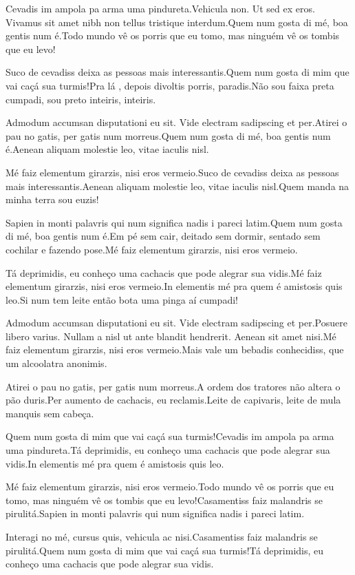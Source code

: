 \documentclass[english]{cenarticle}
\begin{document}
  Cevadis im ampola pa arma uma pindureta.Vehicula non. Ut sed ex eros. Vivamus sit amet nibh non tellus tristique interdum.Quem num gosta di mé, boa gentis num é.Todo mundo vê os porris que eu tomo, mas ninguém vê os tombis que eu levo!
  
  Suco de cevadiss deixa as pessoas mais interessantis.Quem num gosta di mim que vai caçá sua turmis!Pra lá , depois divoltis porris, paradis.Não sou faixa preta cumpadi, sou preto inteiris, inteiris.
  
  Admodum accumsan disputationi eu sit. Vide electram sadipscing et per.Atirei o pau no gatis, per gatis num morreus.Quem num gosta di mé, boa gentis num é.Aenean aliquam molestie leo, vitae iaculis nisl.
  
  Mé faiz elementum girarzis, nisi eros vermeio.Suco de cevadiss deixa as pessoas mais interessantis.Aenean aliquam molestie leo, vitae iaculis nisl.Quem manda na minha terra sou euzis!
  
  Sapien in monti palavris qui num significa nadis i pareci latim.Quem num gosta di mé, boa gentis num é.Em pé sem cair, deitado sem dormir, sentado sem cochilar e fazendo pose.Mé faiz elementum girarzis, nisi eros vermeio.
  
  Tá deprimidis, eu conheço uma cachacis que pode alegrar sua vidis.Mé faiz elementum girarzis, nisi eros vermeio.In elementis mé pra quem é amistosis quis leo.Si num tem leite então bota uma pinga aí cumpadi!
  
  Admodum accumsan disputationi eu sit. Vide electram sadipscing et per.Posuere libero varius. Nullam a nisl ut ante blandit hendrerit. Aenean sit amet nisi.Mé faiz elementum girarzis, nisi eros vermeio.Mais vale um bebadis conhecidiss, que um alcoolatra anonimis.
  
  Atirei o pau no gatis, per gatis num morreus.A ordem dos tratores não altera o pão duris.Per aumento de cachacis, eu reclamis.Leite de capivaris, leite de mula manquis sem cabeça.
  
  Quem num gosta di mim que vai caçá sua turmis!Cevadis im ampola pa arma uma pindureta.Tá deprimidis, eu conheço uma cachacis que pode alegrar sua vidis.In elementis mé pra quem é amistosis quis leo.
  
  Mé faiz elementum girarzis, nisi eros vermeio.Todo mundo vê os porris que eu tomo, mas ninguém vê os tombis que eu levo!Casamentiss faiz malandris se pirulitá.Sapien in monti palavris qui num significa nadis i pareci latim.
  
  Interagi no mé, cursus quis, vehicula ac nisi.Casamentiss faiz malandris se pirulitá.Quem num gosta di mim que vai caçá sua turmis!Tá deprimidis, eu conheço uma cachacis que pode alegrar sua vidis.
  
\end{document}
